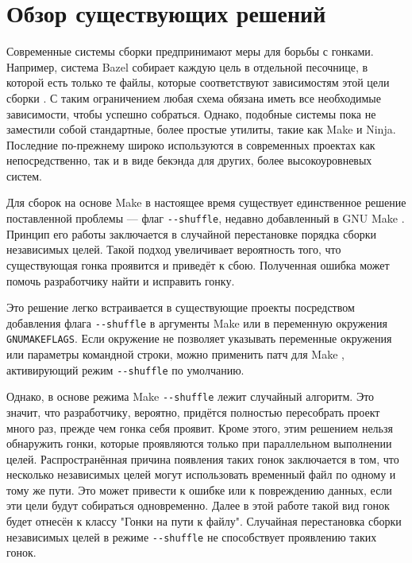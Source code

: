 \section{Обзор существующих решений}
\label{sec:Chapter2} 


Современные системы сборки предпринимают меры для борьбы с гонками. Например, система Bazel собирает каждую цель в отдельной песочнице, в которой есть только те файлы, которые соответствуют зависимостям этой цели сборки \cite{bazel-sandbox}. С таким ограничением любая схема обязана иметь все необходимые зависимости, чтобы успешно собраться. Однако, подобные системы пока не заместили собой стандартные, более простые утилиты, такие как Make и Ninja. Последние по-прежнему широко используются в современных проектах как непосредственно, так и в виде бекэнда для других, более высокоуровневых систем.

Для сборок на основе Make в настоящее время существует единственное решение поставленной проблемы --- флаг \texttt{{-}{-}shuffle}, недавно добавленный в GNU Make \cite{trofi-make-shuffle}. Принцип его работы заключается в случайной перестановке порядка сборки независимых целей. Такой подход увеличивает вероятность того, что существующая гонка проявится и приведёт к сбою. Полученная ошибка может помочь разработчику найти и исправить гонку.

Это решение легко встраивается в существующие проекты посредством добавления флага \texttt{{-}{-}shuffle} в аргументы Make или в переменную окружения \texttt{GNUMAKEFLAGS}. Если окружение не позволяет указывать переменные окружения или параметры командной строки, можно применить патч для Make \cite{make-shuffle-patch}, активирующий режим \texttt{{-}{-}shuffle} по умолчанию.

Однако, в основе режима Make \texttt{{-}{-}shuffle} лежит случайный алгоритм. Это значит, что разработчику, вероятно, придётся полностью пересобрать проект много раз, прежде чем гонка себя проявит. Кроме этого, этим решением нельзя обнаружить гонки, которые проявляются только при параллельном выполнении целей. Распространённая причина появления таких гонок заключается в том, что несколько независимых целей могут использовать временный файл по одному и тому же пути. Это может привести к ошибке или к повреждению данных, если эти цели будут собираться одновременно. Далее в этой работе такой вид гонок будет отнесён к классу "Гонки на пути к файлу". Случайная перестановка сборки независимых целей в режиме \texttt{{-}{-}shuffle} не способствует проявлению таких гонок.